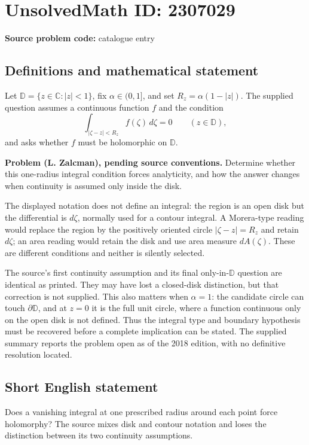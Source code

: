 \documentclass[11pt]{article}
\begin{document}
\section*{UnsolvedMath ID: 2307029}
\textbf{Source problem code:} catalogue entry
\subsection{Definitions and mathematical statement}
Let $\mathbb D=\{z\in\mathbb C:|z|<1\}$, fix $\alpha\in(0,1]$, and set $R_z=\alpha(1-|z|)$. The supplied question assumes a continuous function $f$ and the condition
\[
\int_{|\zeta-z|<R_z}f(\zeta)\,d\zeta=0
\qquad(z\in\mathbb D),
\]
and asks whether $f$ must be holomorphic on $\mathbb D$.

\textbf{Problem (L. Zalcman), pending source conventions.} Determine whether this one-radius integral condition forces analyticity, and how the answer changes when continuity is assumed only inside the disk.

The displayed notation does not define an integral: the region is an open disk but the differential is $d\zeta$, normally used for a contour integral. A Morera-type reading would replace the region by the positively oriented circle $|\zeta-z|=R_z$ and retain $d\zeta$; an area reading would retain the disk and use area measure $dA(\zeta)$. These are different conditions and neither is silently selected.

The source's first continuity assumption and its final only-in-$\mathbb D$ question are identical as printed. They may have lost a closed-disk distinction, but that correction is not supplied. This also matters when $\alpha=1$: the candidate circle can touch $\partial\mathbb D$, and at $z=0$ it is the full unit circle, where a function continuous only on the open disk is not defined. Thus the integral type and boundary hypothesis must be recovered before a complete implication can be stated. The supplied summary reports the problem open as of the 2018 edition, with no definitive resolution located.
\subsection{Short English statement}
Does a vanishing integral at one prescribed radius around each point force holomorphy? The source mixes disk and contour notation and loses the distinction between its two continuity assumptions.
\end{document}
